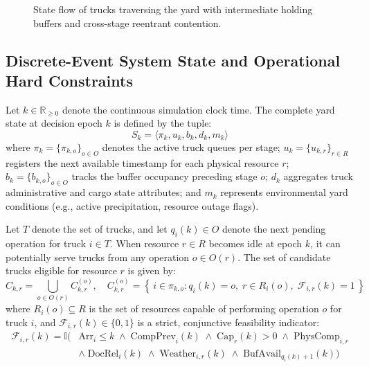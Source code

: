 \documentclass[11pt,a4paper]{article}
\begin{document}
\begin{figure}[H]
{%
}
\caption{State flow of trucks traversing the yard with intermediate holding buffers and cross-stage reentrant contention.}
\label{fig:flow-diagram}
\end{figure}

\subsection{Discrete-Event System State and Operational Hard Constraints}
Let $k \in \mathbb{R}_{\ge 0}$ denote the continuous simulation clock time. The complete yard state at decision epoch $k$ is defined by the tuple:
\begin{equation}
  S_k = \langle \pi_k, u_k, b_k, d_k, m_k \rangle
\end{equation}
where $\pi_k = \{\pi_{k,o}\}_{o \in O}$ denotes the active truck queues per stage; $u_k = \{u_{k,r}\}_{r \in R}$ registers the next available timestamp for each physical resource $r$; $b_k = \{b_{k,o}\}_{o \in O}$ tracks the buffer occupancy preceding stage $o$; $d_k$ aggregates truck administrative and cargo state attributes; and $m_k$ represents environmental yard conditions (e.g., active precipitation, resource outage flags).

Let $T$ denote the set of trucks, and let $q_i(k) \in O$ denote the next pending operation for truck $i \in T$. When resource $r \in R$ becomes idle at epoch $k$, it can potentially serve trucks from any operation $o \in O(r)$. The set of candidate trucks eligible for resource $r$ is given by:
\begin{equation}
  C_{k,r} = \bigcup_{o \in O(r)} C^{(o)}_{k,r}, \quad C^{(o)}_{k,r} = \left\{\, i \in \pi_{k,o} : q_i(k)=o,\; r \in R_i(o),\; \mathcal{F}_{i,r}(k)=1 \,\right\}
\end{equation}
where $R_i(o) \subseteq R$ is the set of resources capable of performing operation $o$ for truck $i$, and $\mathcal{F}_{i,r}(k) \in \{0, 1\}$ is a strict, conjunctive feasibility indicator:
\begin{equation}
\begin{aligned}
  \mathcal{F}_{i,r}(k) = \mathbb{I}\Big( & \mathrm{Arr}_i \le k \;\land\; \mathrm{CompPrev}_i(k) \;\land\; \mathrm{Cap}_r(k) > 0 \;\land\; \mathrm{PhysComp}_{i,r} \\
  & \land\; \mathrm{DocRel}_i(k) \;\land\; \mathrm{Weather}_{i,r}(k) \;\land\; \mathrm{BufAvail}_{q_i(k)+1}(k) \Big)
\end{aligned}
\end{equation}
\end{document}
